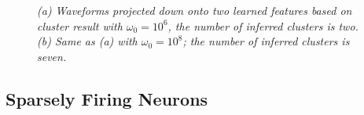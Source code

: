 \documentclass[journal]{IEEEtran}
\begin{document}
\begin{figure}[!htbp]
\centering

  \caption{\label{fig:Tuning_Parameter}\small \emph{
(a) Waveforms projected down onto two learned features based on cluster result with $\omega_0=10^{6}$, the number of inferred clusters is two. (b) Same as (a) with $\omega_0=10^{8}$; the number of inferred clusters is seven.
   }}
\end{figure}



\subsection{Sparsely Firing Neurons} \label{sec:sparse}
\end{document}
